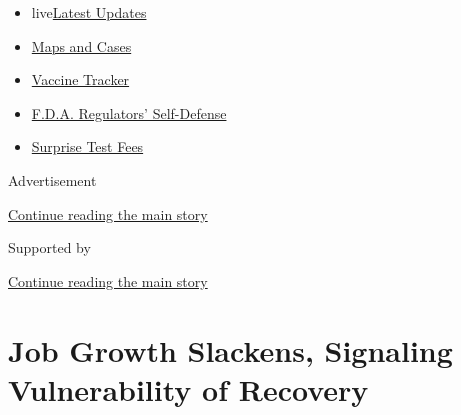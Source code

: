 \begin{itemize}
\tightlist
\item
  live\href{https://www.nytimes3xbfgragh.onion/2020/09/11/world/covid-19-coronavirus.html?name=styln-coronavirus-markets\&region=TOP_BANNER\&block=storyline_menu_recirc\&action=click\&pgtype=Article\&impression_id=3ef970c0-f4c9-11ea-8e77-775acd3382e0\&variant=undefined}{Latest
  Updates}
\item
  \href{https://www.nytimes3xbfgragh.onion/interactive/2020/us/coronavirus-us-cases.html?name=styln-coronavirus-markets\&region=TOP_BANNER\&block=storyline_menu_recirc\&action=click\&pgtype=Article\&impression_id=3ef970c1-f4c9-11ea-8e77-775acd3382e0\&variant=undefined}{Maps
  and Cases}
\item
  \href{https://www.nytimes3xbfgragh.onion/interactive/2020/science/coronavirus-vaccine-tracker.html?name=styln-coronavirus-markets\&region=TOP_BANNER\&block=storyline_menu_recirc\&action=click\&pgtype=Article\&impression_id=3ef970c2-f4c9-11ea-8e77-775acd3382e0\&variant=undefined}{Vaccine
  Tracker}
\item
  \href{https://www.nytimes3xbfgragh.onion/2020/09/10/us/politics/fda-coronavirus-vaccine.html?name=styln-coronavirus-markets\&region=TOP_BANNER\&block=storyline_menu_recirc\&action=click\&pgtype=Article\&impression_id=3ef970c3-f4c9-11ea-8e77-775acd3382e0\&variant=undefined}{F.D.A.
  Regulators' Self-Defense}
\item
  \href{https://www.nytimes3xbfgragh.onion/2020/09/09/upshot/coronavirus-surprise-test-fees.html?name=styln-coronavirus-markets\&region=TOP_BANNER\&block=storyline_menu_recirc\&action=click\&pgtype=Article\&impression_id=3ef970c4-f4c9-11ea-8e77-775acd3382e0\&variant=undefined}{Surprise
  Test Fees}
\end{itemize}

Advertisement

\protect\hyperlink{after-top}{Continue reading the main story}

Supported by

\protect\hyperlink{after-sponsor}{Continue reading the main story}

\hypertarget{job-growth-slackens-signaling-vulnerability-of-recovery}{%
\section{Job Growth Slackens, Signaling Vulnerability of
Recovery}\label{job-growth-slackens-signaling-vulnerability-of-recovery}}

